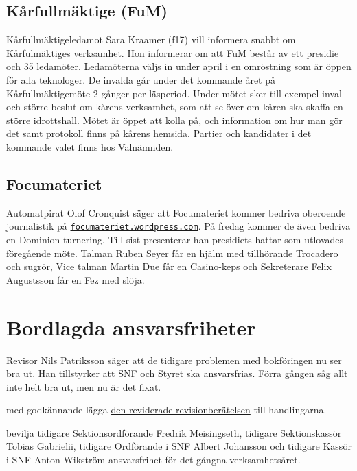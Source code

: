 \documentclass[hidelinks]{sektionsmote}
\begin{document}
\subsection{Kårfullmäktige (FuM)}
Kårfullmäktigeledamot Sara Kraamer (f17) vill informera snabbt om Kårfulmäktiges verksamhet.
Hon informerar om att FuM består av ett presidie och 35 ledamöter.
Ledamöterna väljs in under april i en omröstning som är öppen för alla teknologer.
De invalda går under det kommande året på Kårfullmäktigemöte 2 gånger per läsperiod.
Under mötet sker till exempel inval och större beslut om kårens verksamhet, som att se över om kåren ska skaffa en större idrottshall.
Mötet är öppet att kolla på, och information om hur man gör det samt protokoll finns på \href{https://chalmersstudentkar.se/union-council/}{kårens hemsida}.
Partier och kandidater i det kommande valet finns hos \href{https://www.facebook.com/fumval/}{Valnämnden}.

\subsection{Focumateriet}
Automatpirat Olof Cronquist säger att Focumateriet kommer bedriva oberoende journalistik på \newline\href{https://focumateriet.wordpress.com}{\texttt{focumateriet.wordpress.com}}.
På fredag kommer de även bedriva en Dominion-turnering.
Till sist presenterar han presidiets hattar som utlovades föregående möte.
Talman Ruben Seyer får en hjälm med tillhörande Trocadero och sugrör, Vice talman Martin Due får en Casino-keps och Sekreterare Felix Augustsson får en Fez med slöja.


\section{Bordlagda ansvarsfriheter}
Revisor Nils Patriksson säger att de tidigare problemen med bokföringen nu ser bra ut.
Han tillstyrker att SNF och Styret ska ansvarsfrias.
Förra gången såg allt inte helt bra ut, men nu är det fixat.
\begin{beslut}
  \item med godkännande lägga \hyperlink{bilagor/revisionsnf1920.pdf.1}{den reviderade revisionberätelsen} till handlingarna.
  \item bevilja tidigare Sektionsordförande Fredrik Meisingseth, tidigare Sektionskassör Tobias Gabrielii, tidigare Ordförande i SNF Albert Johansson och tidigare Kassör i SNF Anton Wikström ansvarsfrihet för det gångna verksamhetsåret.
\end{beslut}
\end{document}
